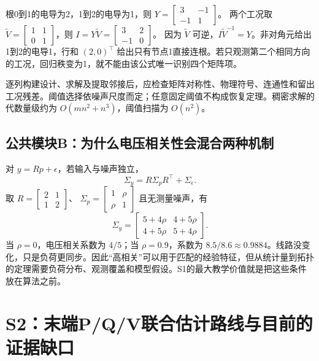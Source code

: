 \begin{example}[两节点精确求解]
根0到1的电导为2，1到2的电导为1，则
$Y=\left[\begin{smallmatrix}3&-1\\-1&1\end{smallmatrix}\right]$。
两个工况取 $\widetilde V=\left[\begin{smallmatrix}1&1\\0&1\end{smallmatrix}\right]$，则
$I=Y\widetilde V=\left[\begin{smallmatrix}3&2\\-1&0\end{smallmatrix}\right]$。
因为 $\widetilde V$ 可逆，$I\widetilde V^{-1}=Y$。非对角元给出1到2的电导1，行和 $(2,0)^\top$ 给出只有节点1直接连根。若只观测第二个相同方向的工况，回归秩变为1，就不能由该公式唯一识别四个矩阵项。
\end{example}
逐列构建设计、求解及提取邻接后，应检查矩阵对称性、物理符号、连通性和留出工况残差。阈值选择依噪声尺度而定；任意固定阈值不构成恢复定理。稠密求解的代数量级约为 $O(mn^2+n^3)$，阈值扫描为 $O(n^2)$。

\subsection{公共模块B：为什么电压相关性会混合两种机制}
对 $y=Rp+\epsilon$，若输入与噪声独立，
\begin{equation}
 \Sigma_y=R\Sigma_pR^\top+\Sigma_\epsilon.
\end{equation}
取 $R=\left[\begin{smallmatrix}2&1\\1&2\end{smallmatrix}\right]$、
$\Sigma_p=\left[\begin{smallmatrix}1&\rho\\\rho&1\end{smallmatrix}\right]$ 且无测量噪声，有
\begin{equation}
 \Sigma_y=\begin{bmatrix}5+4\rho&4+5\rho\\4+5\rho&5+4\rho\end{bmatrix}.
\end{equation}
当 $\rho=0$，电压相关系数为 $4/5$；当 $\rho=0.9$，系数为 $8.5/8.6\approx0.9884$。线路没变化，只是负荷更同步。因此“高相关”可以用于匹配的经验特征，但从统计量到拓扑的定理需要负荷分布、观测覆盖和模型假设。S1的最大教学价值就是把这些条件放在算法之前。

\section{S2：末端P/Q/V联合估计路线与目前的证据缺口}
